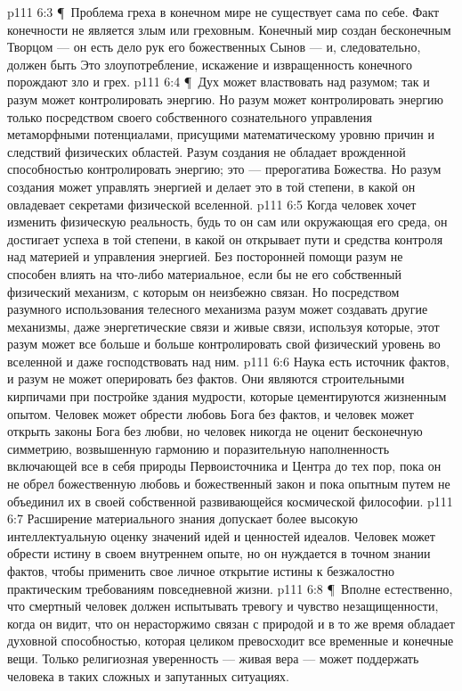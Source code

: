 \vs p111 6:3 \P\ Проблема греха в конечном мире не существует сама по себе. Факт конечности не является злым или греховным. Конечный мир создан бесконечным Творцом --- он есть дело рук его божественных Сынов --- и, следовательно, должен быть  Это злоупотребление, искажение и извращенность конечного порождают зло и грех.
\vs p111 6:4 \P\ Дух может властвовать над разумом; так и разум может контролировать энергию. Но разум может контролировать энергию только посредством своего собственного сознательного управления метаморфными потенциалами, присущими математическому уровню причин и следствий физических областей. Разум создания не обладает врожденной способностью контролировать энергию; это --- прерогатива Божества. Но разум создания может управлять энергией и делает это в той степени, в какой он овладевает секретами физической вселенной.
\vs p111 6:5 Когда человек хочет изменить физическую реальность, будь то он сам или окружающая его среда, он достигает успеха в той степени, в какой он открывает пути и средства контроля над материей и управления энергией. Без посторонней помощи разум не способен влиять на что\hyp{}либо материальное, если бы не его собственный физический механизм, с которым он неизбежно связан. Но посредством разумного использования телесного механизма разум может создавать другие механизмы, даже энергетические связи и живые связи, используя которые, этот разум может все больше и больше контролировать свой физический уровень во вселенной и даже господствовать над ним.
\vs p111 6:6 Наука есть источник фактов, и разум не может оперировать без фактов. Они являются строительными кирпичами при постройке здания мудрости, которые цементируются жизненным опытом. Человек может обрести любовь Бога без фактов, и человек может открыть законы Бога без любви, но человек никогда не оценит бесконечную симметрию, возвышенную гармонию и поразительную наполненность включающей все в себя природы Первоисточника и Центра до тех пор, пока он не обрел божественную любовь и божественный закон и пока опытным путем не объединил их в своей собственной развивающейся космической философии.
\vs p111 6:7 Расширение материального знания допускает более высокую интеллектуальную оценку значений идей и ценностей идеалов. Человек может обрести истину в своем внутреннем опыте, но он нуждается в точном знании фактов, чтобы применить свое личное открытие истины к безжалостно практическим требованиям повседневной жизни.
\vs p111 6:8 \P\ Вполне естественно, что смертный человек должен испытывать тревогу и чувство незащищенности, когда он видит, что он нерасторжимо связан с природой и в то же время обладает духовной способностью, которая целиком превосходит все временные и конечные вещи. Только религиозная уверенность --- живая вера --- может поддержать человека в таких сложных и запутанных ситуациях.

